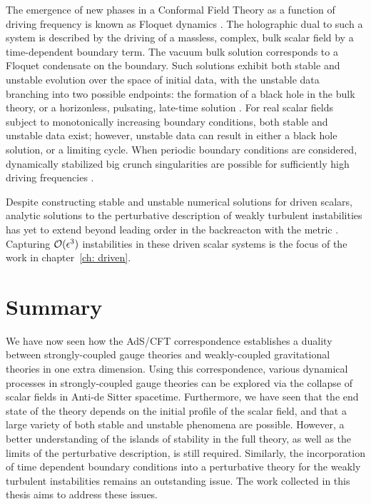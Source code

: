\documentclass[../PhD.tex]{subfiles}
\begin{document}
The emergence of new phases in a Conformal Field Theory as a function of driving frequency is known as Floquet dynamics \cite{1805.00031, 1802.05285}. The holographic dual to such a system is described by the driving of a massless, complex, bulk scalar field by a time-dependent boundary term. The vacuum bulk solution corresponds to a Floquet condensate on the boundary. Such solutions exhibit both stable and unstable evolution over the space of initial data, with the unstable data branching into two possible endpoints: the formation of a black hole in the bulk theory, or a horizonless, pulsating, late-time solution \cite{1612.07701, 1712.07637}. For real scalar fields subject to monotonically increasing boundary conditions, both stable and unstable data exist; however, unstable data can result in either a black hole solution, or a limiting cycle. When periodic boundary conditions are considered, dynamically stabilized big crunch singularities are possible for sufficiently high driving frequencies \cite{1206.2902}. 

Despite constructing stable and unstable numerical solutions for driven scalars, analytic solutions to the perturbative description of weakly turbulent instabilities has yet to extend beyond leading order in the backreacton with the metric \cite{1308.2132}. Capturing $\mathcal O(\epsilon^3)$ instabilities in these driven scalar systems is the focus of the work in chapter~\ref{ch: driven}. 



\section{Summary}
\label{sec: summary}

We have now seen how the AdS/CFT correspondence establishes a duality between strongly-coupled gauge theories and weakly-coupled gravitational theories in one extra dimension. Using this correspondence, various dynamical processes in strongly-coupled gauge theories can be explored via the collapse of scalar fields in Anti-de Sitter spacetime. Furthermore, we have seen that the end state of the theory depends on the initial profile of the scalar field, and that a large variety of both stable and unstable phenomena are possible. However, a better understanding of the islands of stability in the full theory, as well as the limits of the perturbative description, is still required. Similarly, the incorporation of time dependent boundary conditions into a perturbative theory for the weakly turbulent instabilities remains an outstanding issue. The work collected in this thesis aims to address these issues.
\end{document}

